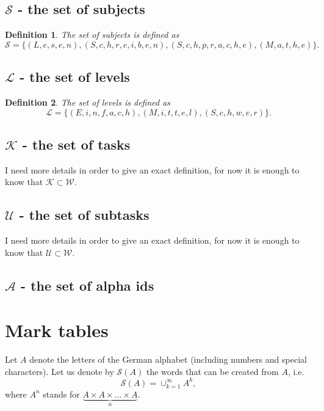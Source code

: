 \documentclass{scrartcl}
\newtheorem{mydef}{Definition}
\begin{document}
\subsection{$\mathcal{S}$ - the set of subjects}
\begin{mydef}
The \emph{set of subjects} is defined as
\begin{equation}
\mathcal{S}=\{(L,e,s,e,n),(S,c,h,r,e,i,b,e,n),(S,c,h,p,r,a,c,h,e),(M,a,t,h,e)\}.
\end{equation}
\end{mydef}

\subsection{$\mathcal{L}$ - the set of levels}
\begin{mydef}
The \emph{set of levels} is defined as
\begin{equation}
\mathcal{L}=\{(E,i,n,f,a,c,h),(M,i,t,t,e,l),(S,c,h,w,e,r)\}.
\end{equation}
\end{mydef}

\subsection{$\mathcal{K}$ - the set of tasks}
I need more details in order to give an exact definition, for now it is enough to know that $\mathcal{K}\subset\mathcal{W}$.

\subsection{$\mathcal{U}$ - the set of subtasks}
I need more details in order to give an exact definition, for now it is enough to know that $\mathcal{U}\subset\mathcal{W}$.

\subsection{$\mathcal{A}$ - the set of alpha ids}


\section{Mark tables}
Let $A$ denote the letters of the German alphabet (including numbers and special characters). Let us denote by $\mathcal{S}(A)$ the words that can be created from $A$, i.e.
$$\mathcal{S}(A)=\cup_{k=1}^{\infty}A^k,$$
where $A^n$ stands for $\underbrace{A\times A\times\ldots \times A}_{n}$. 
\end{document}
